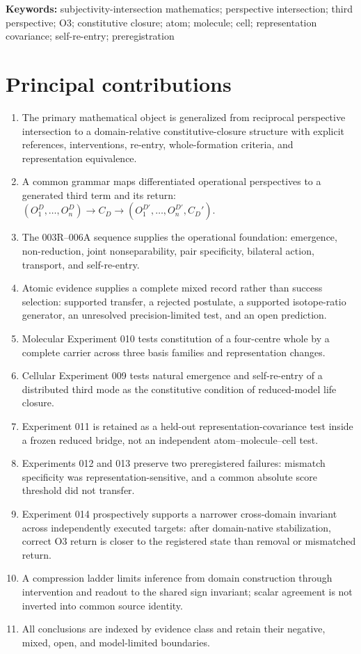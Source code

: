\documentclass[11pt,a4paper]{article}
\begin{document}
\noindent\textbf{Keywords:} subjectivity-intersection mathematics; perspective intersection; third perspective; O3; constitutive closure; atom; molecule; cell; representation covariance; self-re-entry; preregistration

\section*{Principal contributions}
{\small
\begin{enumerate}[itemsep=0.1em,topsep=0.25em]
  \item The primary mathematical object is generalized from reciprocal perspective intersection to a domain-relative constitutive-closure structure with explicit references, interventions, re-entry, whole-formation criteria, and representation equivalence.
  \item A common grammar maps differentiated operational perspectives to a generated third term and its return: $(O_1^D,\ldots,O_n^D)\rightarrow C_D\rightarrow(O_1^{D\prime},\ldots,O_n^{D\prime},C_D')$.
  \item The 003R--006A sequence supplies the operational foundation: emergence, non-reduction, joint nonseparability, pair specificity, bilateral action, transport, and self-re-entry.
  \item Atomic evidence supplies a complete mixed record rather than success selection: supported transfer, a rejected postulate, a supported isotope-ratio generator, an unresolved precision-limited test, and an open prediction.
  \item Molecular Experiment 010 tests constitution of a four-centre whole by a complete carrier across three basis families and representation changes.
  \item Cellular Experiment 009 tests natural emergence and self-re-entry of a distributed third mode as the constitutive condition of reduced-model life closure.
  \item Experiment 011 is retained as a held-out representation-covariance test inside a frozen reduced bridge, not an independent atom--molecule--cell test.
  \item Experiments 012 and 013 preserve two preregistered failures: mismatch specificity was representation-sensitive, and a common absolute score threshold did not transfer.
  \item Experiment 014 prospectively supports a narrower cross-domain invariant across independently executed targets: after domain-native stabilization, correct O3 return is closer to the registered state than removal or mismatched return.
  \item A compression ladder limits inference from domain construction through intervention and readout to the shared sign invariant; scalar agreement is not inverted into common source identity.
  \item All conclusions are indexed by evidence class and retain their negative, mixed, open, and model-limited boundaries.
\end{enumerate}
}
\end{document}
